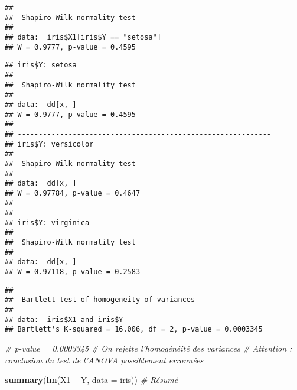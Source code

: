 \documentclass[
]{article}
\newenvironment{Shaded}{\begin{snugshade}}{\end{snugshade}}
\newcommand{\CommentTok}[1]{\textcolor[rgb]{0.56,0.35,0.01}{\textit{#1}}}
\newcommand{\DataTypeTok}[1]{\textcolor[rgb]{0.13,0.29,0.53}{#1}}
\newcommand{\KeywordTok}[1]{\textcolor[rgb]{0.13,0.29,0.53}{\textbf{#1}}}
\newcommand{\NormalTok}[1]{#1}
\newcommand{\OperatorTok}[1]{\textcolor[rgb]{0.81,0.36,0.00}{\textbf{#1}}}
\newcommand{\StringTok}[1]{\textcolor[rgb]{0.31,0.60,0.02}{#1}}
\begin{document}
\begin{verbatim}
## 
##  Shapiro-Wilk normality test
## 
## data:  iris$X1[iris$Y == "setosa"]
## W = 0.9777, p-value = 0.4595
\end{verbatim}

\begin{Shaded}
\end{Shaded}

\begin{verbatim}
## iris$Y: setosa
## 
##  Shapiro-Wilk normality test
## 
## data:  dd[x, ]
## W = 0.9777, p-value = 0.4595
## 
## ------------------------------------------------------------ 
## iris$Y: versicolor
## 
##  Shapiro-Wilk normality test
## 
## data:  dd[x, ]
## W = 0.97784, p-value = 0.4647
## 
## ------------------------------------------------------------ 
## iris$Y: virginica
## 
##  Shapiro-Wilk normality test
## 
## data:  dd[x, ]
## W = 0.97118, p-value = 0.2583
\end{verbatim}

\begin{Shaded}
\end{Shaded}

\begin{verbatim}
## 
##  Bartlett test of homogeneity of variances
## 
## data:  iris$X1 and iris$Y
## Bartlett's K-squared = 16.006, df = 2, p-value = 0.0003345
\end{verbatim}

\begin{Shaded}
\begin{Highlighting}[]
\CommentTok{# p-value = 0.0003345}
\CommentTok{# On rejette l'homogénéité des variances}
\CommentTok{# Attention : conclusion du test de l'ANOVA possiblement erronnées}

\KeywordTok{summary}\NormalTok{(}\KeywordTok{lm}\NormalTok{(X1 }\OperatorTok{~}\StringTok{ }\NormalTok{Y, }\DataTypeTok{data =}\NormalTok{ iris)) }\CommentTok{# Résumé}
\end{Highlighting}
\end{Shaded}
\end{document}
